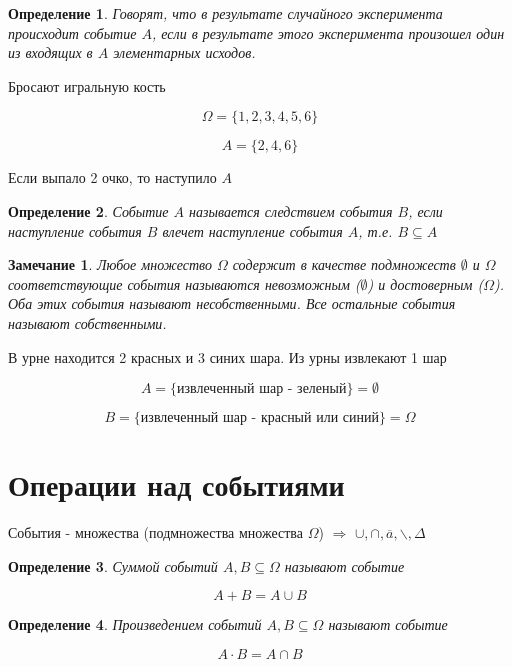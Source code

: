 \documentclass[a4paper, 14pt]{report}
\newtheorem{defenition}{Определение}[section]
\newtheorem{note}{Замечание}[section]
\begin{document}
\begin{defenition}
    Говорят, что в результате случайного эксперимента происходит событие $A$, если в результате этого эксперимента произошел один из входящих в $A$ элементарных исходов.
\end{defenition}

Бросают игральную кость

$$
\Omega = \{ 1,2,3,4,5,6 \}
$$

$$
A = \{2,4,6\}
$$

Если выпало 2 очко, то наступило $A$

\begin{defenition}
    Событие $A$ называется следствием события $B$, если наступление события $B$ влечет наступление события $A$, т.е. $B \subseteq A$
\end{defenition}

\begin{note}
    Любое множество $\Omega$ содержит в качестве подмножеств $\emptyset$ и $\Omega$ соответствующие события называются невозможным ($\emptyset$) и достоверным ($\Omega$). Оба этих события называют несобственными. Все остальные события называют собственными.
\end{note}

В урне находится 2 красных и 3 синих шара. Из урны извлекают 1 шар

$$
A = \{ \text{извлеченный шар - зеленый} \} = \emptyset
$$

$$
B = \{ \text{извлеченный шар - красный или синий} \} = \Omega
$$

\section{Операции над событиями}

События - множества (подмножества множества $\Omega$) $\Rightarrow$ $\cup, \cap, \overline{a}, \backslash, \Delta$ 

\begin{defenition}
    Суммой событий $A,B \subseteq \Omega$ называют событие

    $$
    A + B = A \cup B
    $$
\end{defenition}

\begin{defenition}
    Произведением событий $A,B \subseteq \Omega$ называют событие

    $$
    A \cdot B = A \cap B
    $$
\end{defenition}
\end{document}
